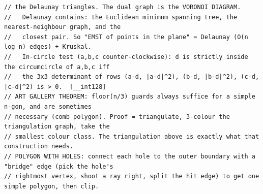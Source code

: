 \documentclass[9pt,a4paper,twocolumn]{extarticle}
\begin{document}
\begin{lstlisting}
// the Delaunay triangles. The dual graph is the VORONOI DIAGRAM.
//   Delaunay contains: the Euclidean minimum spanning tree, the nearest-neighbour graph, and the
//   closest pair. So "EMST of points in the plane" = Delaunay (O(n log n) edges) + Kruskal.
//   In-circle test (a,b,c counter-clockwise): d is strictly inside the circumcircle of a,b,c iff
//   the 3x3 determinant of rows (a-d, |a-d|^2), (b-d, |b-d|^2), (c-d, |c-d|^2) is > 0.  [__int128]
// ART GALLERY THEOREM: floor(n/3) guards always suffice for a simple n-gon, and are sometimes
// necessary (comb polygon). Proof = triangulate, 3-colour the triangulation graph, take the
// smallest colour class. The triangulation above is exactly what that construction needs.
// POLYGON WITH HOLES: connect each hole to the outer boundary with a "bridge" edge (pick the hole's
// rightmost vertex, shoot a ray right, split the hit edge) to get one simple polygon, then clip.
\end{lstlisting}

\filbreak
\end{document}
